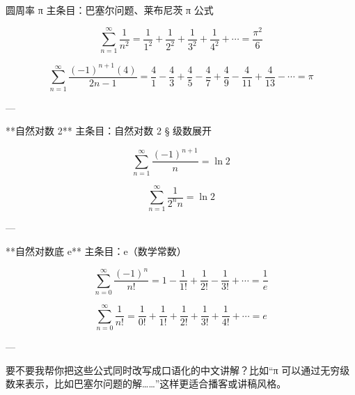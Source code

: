 圆周率 π
主条目：巴塞尔问题、莱布尼茨 π 公式

$$
\sum_{n=1}^{\infty}\frac{1}{n^{2}}=\frac{1}{1^{2}}+\frac{1}{2^{2}}+\frac{1}{3^{2}}+\frac{1}{4^{2}}+\cdots = \frac{\pi^{2}}{6}
$$

$$
\sum_{n=1}^{\infty}\frac{(-1)^{n+1}(4)}{2n-1}=\frac{4}{1}-\frac{4}{3}+\frac{4}{5}-\frac{4}{7}+\frac{4}{9}-\frac{4}{11}+\frac{4}{13}-\cdots = \pi
$$

---

**自然对数 2**
主条目：自然对数 2 § 级数展开

$$
\sum_{n=1}^{\infty}\frac{(-1)^{n+1}}{n}=\ln 2
$$

$$
\sum_{n=1}^{\infty}\frac{1}{2^{n}n}=\ln 2
$$

---

**自然对数底 e**
主条目：e（数学常数）

$$
\sum_{n=0}^{\infty}\frac{(-1)^{n}}{n!}=1-\frac{1}{1!}+\frac{1}{2!}-\frac{1}{3!}+\cdots = \frac{1}{e}
$$

$$
\sum_{n=0}^{\infty}\frac{1}{n!}=\frac{1}{0!}+\frac{1}{1!}+\frac{1}{2!}+\frac{1}{3!}+\frac{1}{4!}+\cdots = e
$$

---

要不要我帮你把这些公式同时改写成口语化的中文讲解？比如“π 可以通过无穷级数来表示，比如巴塞尔问题的解……”这样更适合播客或讲稿风格。


